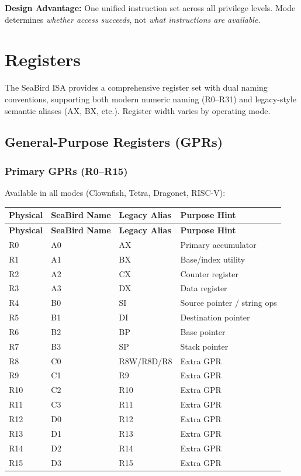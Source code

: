 \documentclass[12pt]{article}
\begin{document}
\textbf{Design Advantage:} One unified instruction set across all privilege levels. Mode determines \textit{whether access succeeds}, not \textit{what instructions are available}.

\section{Registers}

The SeaBird ISA provides a comprehensive register set with dual naming conventions, supporting both modern numeric naming (R0--R31) and legacy-style semantic aliases (AX, BX, etc.). Register width varies by operating mode.

\subsection{General-Purpose Registers (GPRs)}

\subsubsection{Primary GPRs (R0--R15)}

Available in all modes (Clownfish, Tetra, Dragonet, RISC-V):

\begin{longtable}{@{}llll@{}}
\toprule
\textbf{Physical} & \textbf{SeaBird Name} & \textbf{Legacy Alias} & \textbf{Purpose Hint} \\ \midrule
\endfirsthead
\toprule
\textbf{Physical} & \textbf{SeaBird Name} & \textbf{Legacy Alias} & \textbf{Purpose Hint} \\ \midrule
\endhead
R0 & A0 & AX & Primary accumulator \\
R1 & A1 & BX & Base/index utility \\
R2 & A2 & CX & Counter register \\
R3 & A3 & DX & Data register \\
R4 & B0 & SI & Source pointer / string ops \\
R5 & B1 & DI & Destination pointer \\
R6 & B2 & BP & Base pointer \\
R7 & B3 & SP & Stack pointer \\
R8 & C0 & R8W/R8D/R8 & Extra GPR \\
R9 & C1 & R9 & Extra GPR \\
R10 & C2 & R10 & Extra GPR \\
R11 & C3 & R11 & Extra GPR \\
R12 & D0 & R12 & Extra GPR \\
R13 & D1 & R13 & Extra GPR \\
R14 & D2 & R14 & Extra GPR \\
R15 & D3 & R15 & Extra GPR \\ \bottomrule
\end{longtable}
\end{document}
